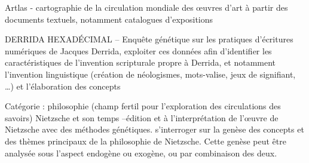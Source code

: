 \begin{table}[htbp]
	\renewcommand{\arraystretch}{1.5}
	\caption{Revues scientifiques axés sur la thématique des circulations des savoirs.}
	\label{tab:revues}
\end{table}


Artlas - cartographie de la circulation mondiale des \oe{}uvres d'art à partir des documents textuels, notamment catalogues d'expositions



DERRIDA HEXADÉCIMAL -- Enquête génétique sur les pratiques d’écritures numériques de Jacques Derrida, exploiter ces données afin d’identifier les caractéristiques de l’invention scripturale propre à Derrida, et notamment l’invention linguistique (création de néologismes, mots-valise, jeux de signifiant, …) et l’élaboration des concepts

Catégorie : philosophie (champ fertil pour l'exploration des circulations des savoirs)
Nietzsche et son temps --édition et à l’interprétation de l’œuvre de Nietzsche avec des méthodes génétiques.  s’interroger sur la genèse des concepts et des thèmes principaux de la philosophie de Nietzsche. Cette genèse peut être analysée sous l’aspect endogène ou exogène, ou par combinaison des deux.

